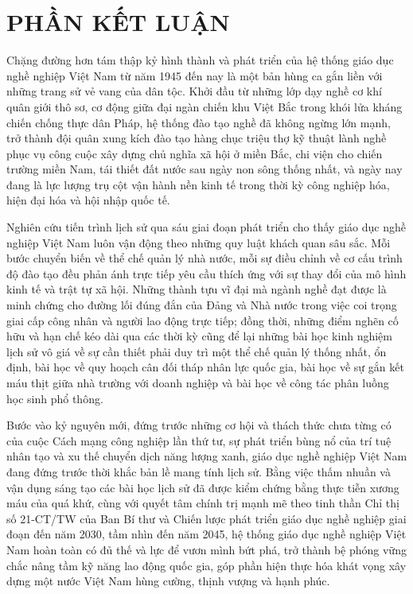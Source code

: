 \section*{PHẦN KẾT LUẬN}

Chặng đường hơn tám thập kỷ hình thành và phát triển của hệ thống giáo dục nghề nghiệp Việt Nam từ năm 1945 đến nay là một bản hùng ca gắn liền với những trang sử vẻ vang của dân tộc. Khởi đầu từ những lớp dạy nghề cơ khí quân giới thô sơ, cơ động giữa đại ngàn chiến khu Việt Bắc trong khói lửa kháng chiến chống thực dân Pháp, hệ thống đào tạo nghề đã không ngừng lớn mạnh, trở thành đội quân xung kích đào tạo hàng chục triệu thợ kỹ thuật lành nghề phục vụ công cuộc xây dựng chủ nghĩa xã hội ở miền Bắc, chi viện cho chiến trường miền Nam, tái thiết đất nước sau ngày non sông thống nhất, và ngày nay đang là lực lượng trụ cột vận hành nền kinh tế trong thời kỳ công nghiệp hóa, hiện đại hóa và hội nhập quốc tế.

Nghiên cứu tiến trình lịch sử qua sáu giai đoạn phát triển cho thấy giáo dục nghề nghiệp Việt Nam luôn vận động theo những quy luật khách quan sâu sắc. Mỗi bước chuyển biến về thể chế quản lý nhà nước, mỗi sự điều chỉnh về cơ cấu trình độ đào tạo đều phản ánh trực tiếp yêu cầu thích ứng với sự thay đổi của mô hình kinh tế và trật tự xã hội. Những thành tựu vĩ đại mà ngành nghề đạt được là minh chứng cho đường lối đúng đắn của Đảng và Nhà nước trong việc coi trọng giai cấp công nhân và người lao động trực tiếp; đồng thời, những điểm nghẽn cố hữu và hạn chế kéo dài qua các thời kỳ cũng để lại những bài học kinh nghiệm lịch sử vô giá về sự cần thiết phải duy trì một thể chế quản lý thống nhất, ổn định, bài học về quy hoạch cân đối tháp nhân lực quốc gia, bài học về sự gắn kết máu thịt giữa nhà trường với doanh nghiệp và bài học về công tác phân luồng học sinh phổ thông.

Bước vào kỷ nguyên mới, đứng trước những cơ hội và thách thức chưa từng có của cuộc Cách mạng công nghiệp lần thứ tư, sự phát triển bùng nổ của trí tuệ nhân tạo và xu thế chuyển dịch năng lượng xanh, giáo dục nghề nghiệp Việt Nam đang đứng trước thời khắc bản lề mang tính lịch sử. Bằng việc thấm nhuần và vận dụng sáng tạo các bài học lịch sử đã được kiểm chứng bằng thực tiễn xương máu của quá khứ, cùng với quyết tâm chính trị mạnh mẽ theo tinh thần Chỉ thị số 21-CT/TW của Ban Bí thư và Chiến lược phát triển giáo dục nghề nghiệp giai đoạn đến năm 2030, tầm nhìn đến năm 2045, hệ thống giáo dục nghề nghiệp Việt Nam hoàn toàn có đủ thế và lực để vươn mình bứt phá, trở thành bệ phóng vững chắc nâng tầm kỹ năng lao động quốc gia, góp phần hiện thực hóa khát vọng xây dựng một nước Việt Nam hùng cường, thịnh vượng và hạnh phúc.
